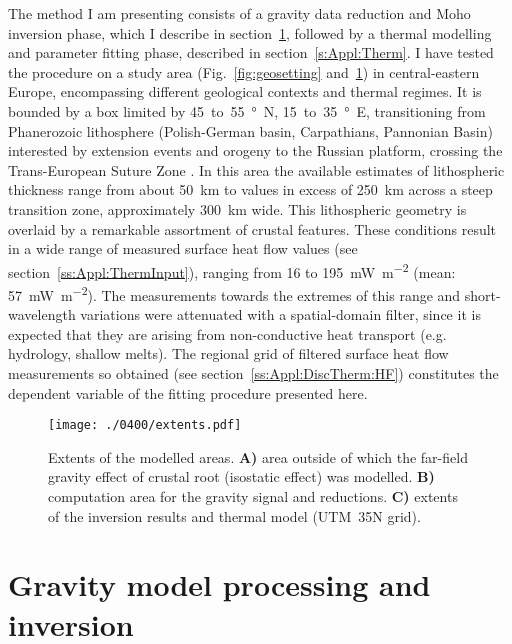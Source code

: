 The method I am presenting consists of a gravity data reduction and Moho inversion phase, which I describe in section~\ref{s:Appl:Grav}, followed by a thermal modelling and parameter fitting phase, described in section~\ref{s:Appl:Therm}.
I have tested the procedure on a study area (Fig.~\ref{fig:geosetting} and~\ref{fig:extents}) in central-eastern Europe, encompassing different geological contexts and thermal regimes.
It is bounded by a box limited by \num{45}~to~\SI{55}{\degree N}, \num{15}~to~\SI{35}{\degree E}, transitioning from Phanerozoic lithosphere (Polish-German basin, Carpathians, Pannonian Basin) interested by extension events and orogeny to the Russian platform, crossing the Trans-European Suture Zone \parencite[TESZ,][]{Jones2010}.
In this area the available estimates of lithospheric thickness range from about 50~\si{\kilo \metre} to values in excess of 250~\si{\kilo \metre} across a steep transition zone, approximately 300~\si{\kilo \metre} wide.
This lithospheric geometry is overlaid by a remarkable assortment of crustal features.
These conditions result in a wide range of measured surface heat flow values (see section~\ref{ss:Appl:ThermInput}), ranging from 16 to 195~\si{\milli \watt \per \square \metre} (mean: 57~\si{\milli \watt \per \square \metre}).
The measurements towards the extremes of this range and short-wavelength variations were attenuated with a spatial-domain filter, since it is expected that they are arising from non-conductive heat transport (e.g. hydrology, shallow melts).
The regional grid of filtered surface heat flow measurements so obtained (see section~\ref{ss:Appl:DiscTherm:HF}) constitutes the dependent variable of the fitting procedure presented here.

\begin{figure}
    \begin{adjustbox}{center}
    \texttt{[image: ./0400/extents.pdf]}
    \end{adjustbox}
    \caption[Gravity modelling: extents of the modelled areas.]{Extents of the modelled areas. \textbf{A)} area outside of which the far-field gravity effect of crustal root (isostatic effect) was modelled. \textbf{B)} computation area for the gravity signal and reductions. \textbf{C)} extents of the inversion results and thermal model (UTM~35N grid).}
	\label{fig:extents}
\end{figure}

\section{Gravity model processing and inversion}
\label{s:Appl:Grav}

